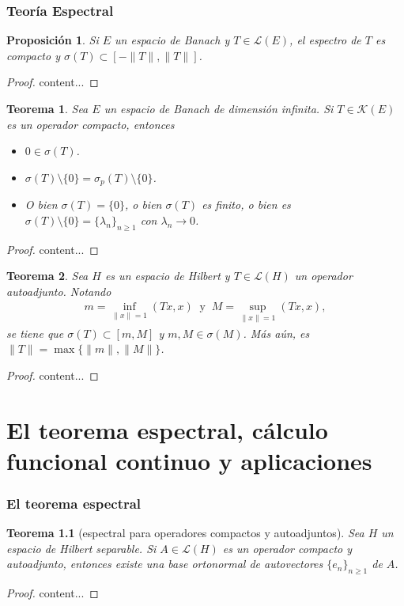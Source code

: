 \documentclass[11pt]{report}
\theoremstyle{colored}
\newtheorem{theorem}{Teorema}[section]
\newtheorem{proposition}{Proposición}[section]
\begin{document}
\subsection{Teoría Espectral}

\begin{proposition} Si $E$ un espacio de Banach y $T \in \mathscr{L}(E)$, el espectro de $T$ es compacto y $\sigma(T) \subset [-\|T\|,\|T\|]$.  
\end{proposition}
\begin{proof}
content...
\end{proof}

\begin{theorem} Sea $E$ un espacio de Banach de dimensión infinita. Si $T \in \mathscr{K}(E)$ es un operador compacto, entonces
\begin{itemize}
\item[(i)] $0 \in \sigma(T)$.
\item[(ii)] $\sigma(T) \setminus \{0\} = \sigma_p(T) \setminus \{0\}$.
\item[(iii)] O bien $\sigma(T) = \{0\}$, o bien $\sigma(T)$ es finito, o bien es $\sigma(T) \setminus \{0\} = \{\lambda_n\}_{n \geq 1}$ con $\lambda_n \to 0$.
\end{itemize} 
\end{theorem}
\begin{proof}
content...
\end{proof}

\begin{theorem} Sea $H$ es un espacio de Hilbert y $T \in \mathscr{L}(H)$ un operador autoadjunto. Notando
\begin{align*}
m = \inf_{\|x\| = 1}(Tx,x) \ \text{ y } \ M = \sup_{\|x\| = 1}(Tx,x),
\end{align*}
se tiene que $\sigma(T) \subset [m,M]$ y $m,M \in \sigma(M)$. Más aún, es $\|T\| = \max\{\|m\|,\|M\|\}$.
\end{theorem}
\begin{proof}
content...
\end{proof}

\chapter{El teorema espectral, cálculo funcional continuo y aplicaciones}
\subsection{El teorema espectral}
\begin{theorem}[espectral para operadores compactos y autoadjuntos] Sea $H$ un espacio de Hilbert separable. Si $A \in \mathscr{L}(H)$ es un operador compacto y autoadjunto, entonces existe una base ortonormal de autovectores $\{e_n\}_{n \geq 1}$ de $A$.
\end{theorem}
\begin{proof}
content...
\end{proof}
\end{document}
